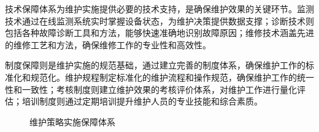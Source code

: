 技术保障体系为维护实施提供必要的技术支持，是确保维护效果的关键环节。监测技术通过在线监测系统实时掌握设备状态，为维护决策提供数据支撑；诊断技术则包括各种故障诊断工具和方法，能够快速准确地识别故障原因；维修技术涵盖先进的维修工艺和方法，确保维修工作的专业性和高效性。

制度保障则是维护实施的规范基础，通过建立完善的制度体系，确保维护工作的标准化和规范化。维护规程制定标准化的维护流程和操作规范，确保维护工作的统一性和一致性；考核制度则建立维护效果的考核评价体系，对维护工作进行量化评估；培训制度则通过定期培训提升维护人员的专业技能和综合素质。

\begin{figure}[h]
\centering
\caption{维护策略实施保障体系}
\label{fig:implementation_guarantee_system}
\end{figure}